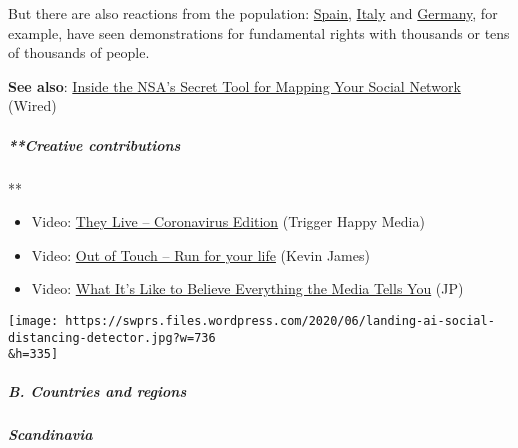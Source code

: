 But there are also reactions from the population:
\href{https://www.youtube.com/watch?v=BZo3BYD2qpI}{Spain},
\href{https://www.youtube.com/watch?v=P2Tcs8RzK1k}{Italy} and
\href{https://www.youtube.com/watch?v=Iqm456JIaBQ}{Germany}, for
example, have seen demonstrations for fundamental rights with thousands
or tens of thousands of people.

\textbf{See also}:
\href{https://www.wired.com/story/inside-the-nsas-secret-tool-for-mapping-your-social-network/}{Inside
the NSA's Secret Tool for Mapping Your Social Network} (Wired)

\hypertarget{creative-contributions}{%
\subparagraph{**Creative contributions}\label{creative-contributions}}

**

\begin{itemize}
\tightlist
\item
  Video: \href{https://archive.org/details/theylivecvversion}{They Live
  -- Coronavirus Edition} (Trigger Happy Media)
\item
  Video: \href{https://www.youtube.com/watch?v=wfGAktuU93s}{Out of Touch
  -- Run for your life} (Kevin James)
\item
  Video: \href{https://www.youtube.com/watch?v=QcUAG6t5aN8}{What It's
  Like to Believe Everything the Media Tells You} (JP)
\end{itemize}

\texttt{[image: https://swprs.files.wordpress.com/2020/06/landing-ai-social-distancing-detector.jpg?w=736\\\&h=335]}

\hypertarget{b-countries-and-regions-1}{%
\subparagraph{\texorpdfstring{\textbf{B. Countries and
regions}}{B. Countries and regions}}\label{b-countries-and-regions-1}}

\hypertarget{scandinavia}{%
\subparagraph{\texorpdfstring{\textbf{Scandinavia}}{Scandinavia}}\label{scandinavia}}

